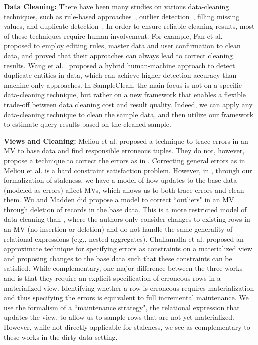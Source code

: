 {\noindent \bf Data Cleaning:} There have been many studies on various data-cleaning techniques, such as rule-based approaches~\cite{fan2012foundations,DBLP:conf/sigmod/DallachiesaEEEIOT13}, outlier detection~\cite{hellerstein2008quantitative,dasu2003exploratory}, filling missing values, and duplicate detection~\cite{conf/hdkm/Christen08, DBLP:conf/kdd/BilenkoM03, conf/sigmod/WangLF12}. In order to ensure reliable cleaning results, most of these techniques require human involvement.
For example, Fan et al.~\cite{DBLP:journals/pvldb/FanLMTY10} proposed to employ editing rules, master data and user confirmation to clean data, and proved that their approaches can always lead to correct cleaning results. Wang et al.~\cite{DBLP:journals/pvldb/WangKFF12} proposed a hybrid human-machine approach to detect duplicate entities in data, which can achieve higher detection accuracy than machine-only approaches. 
In SampleClean, the main focus is not on a specific data-cleaning technique, but rather on a new framework that enables a flexible trade-off between data cleaning cost and result quality.
Indeed, we can apply any data-cleaning technique to clean the sample data, and then utilize our framework to estimate query results based on the cleaned sample. 

\vspace{.5em}

{\noindent \bf Views and Cleaning:} Meliou et al. \cite{DBLP:conf/sigmod/MeliouGNS11} proposed a technique to trace errors in an MV to base data and find responsible erroneous tuples. 
They do not, however, propose a technique to correct the errors as in \svc.
Correcting general errors as in Meliou et al. is a hard constraint satisfaction problem.
However, in \svc, through our formalization of staleness, we have a model of how updates to the base data (modeled as errors) affect MVs, which allows us to both trace errors and clean them.
Wu and Madden \cite{DBLP:journals/pvldb/0002M13} did propose a model to correct ``outliers" in an MV through deletion of records in the base data.
This is a more restricted model of data cleaning than \svc, where the authors only consider changes to existing rows in an MV (no insertion or deletion) and do not handle the same generality of relational expressions (e.g., nested aggregates).
Challamalla et al. \cite{DBLP:conf/sigmod/ChalamallaIOP14} proposed an approximate technique for specifying errors as constraints on a materialized view and proposing changes to the base data such that these constraints can be satisfied.
While complementary, one major difference between the three works \cite{DBLP:conf/sigmod/MeliouGNS11, DBLP:journals/pvldb/0002M13, DBLP:conf/sigmod/ChalamallaIOP14} and \svc is that they require an explicit specification of erroneous rows in a materialized view.
Identifying whether a row is erroneous requires materialization and thus specifying the errors is equivalent to full incremental maintenance. 
We use the formalism of a ``maintenance strategy", the relational expression that updates the view, to allow us to sample rows that are not yet materialized.
However, while not directly applicable for staleness, we see \svc as complementary to these works in the dirty data setting. 


